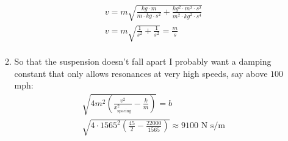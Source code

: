 \documentclass[12pt]{article}
\begin{document}
\begin{enumerate}
\begin{enumerate}
\begin{gather*}
                v=m\sqrt{\frac{kg\cdot m}{m\cdot kg\cdot s^2}+\frac{kg^2\cdot m^2\cdot s^2}{m^2\cdot kg^2\cdot s^4}}\\
                v=m\sqrt{\frac{1}{s^2}+\frac{1}{s^2}}=\frac{m}{s}\\
            \end{gather*}
            \item
            So that the suspension doesn't fall apart I probably want a damping constant that only allows resonances at very high speeds, say above $100$ mph:
            \begin{gather*}
                \sqrt{4m^2\left(\frac{v^2}{x^2_\text{spacing}}-\frac{k}{m}\right)}=b\\
                \sqrt{4\cdot1565^2\left(\frac{45}{2}-\frac{22000}{1565}\right)}\approx 9100\text{ N s/m}\\
            \end{gather*}
        \end{enumerate}
    \end{enumerate}
\end{document}
